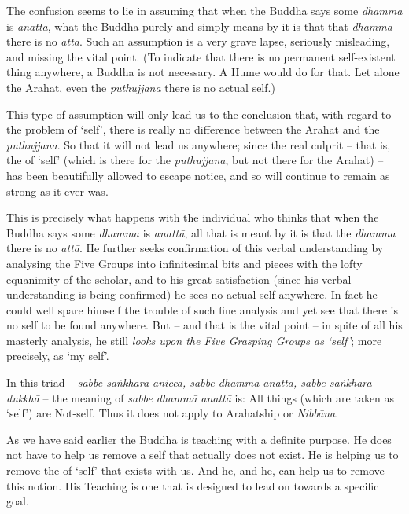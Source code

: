 The confusion seems to lie in assuming that when the Buddha says some \emph{dhamma} is \emph{anattā}, what the Buddha purely and simply means by it is that  that \emph{dhamma} there is no \emph{attā}. Such an assumption is a very grave lapse, seriously misleading, and missing the vital point. (To indicate that there is no permanent self-existent thing anywhere, a Buddha is not necessary. A Hume would do for that. Let alone  the Arahat, even  the \emph{puthujjana} there is no actual self.)

This type of assumption will only lead us to the conclusion that, with regard to the problem of `self', there is really no difference between the Arahat and the \emph{puthujjana}. So that it will not lead us anywhere; since the real culprit -- that is, the  of `self' (which is there for the \emph{puthujjana}, but not there for the Arahat) -- has been beautifully allowed to escape notice, and so will continue to remain as strong as it ever was.

This is precisely what happens with the individual who thinks that when the Buddha says some \emph{dhamma} is \emph{anattā}, all that is meant by it is that  the \emph{dhamma} there is no \emph{attā}. He further seeks confirmation of this verbal understanding by analysing the Five Groups into infinitesimal bits and pieces with the lofty equanimity of the scholar, and to his great satisfaction (since his verbal understanding is being confirmed) he sees no actual self anywhere. In fact he could well spare himself the trouble of such fine analysis and yet see that there is no self to be found anywhere. But -- and that is the vital point -- in spite of all his masterly analysis, he still \emph{looks upon the Five Grasping Groups as `self'}; more precisely, as `my self'.

\clearpage

In this triad -- \emph{sabbe saṅkhārā aniccā, sabbe dhammā anattā, sabbe saṅkhārā dukkhā} -- the meaning of \emph{sabbe dhammā anattā} is: All things (which are taken as `self') are Not-self. Thus it does not apply to Arahatship or \emph{Nibbāna}.

As we have said earlier the Buddha is teaching with a definite purpose. He does not have to help us remove a self that actually does not exist. He is helping us to remove the  of `self' that exists with us. And he, and  he, can help us to remove this notion. His Teaching is one that is designed to lead on towards a specific goal.

